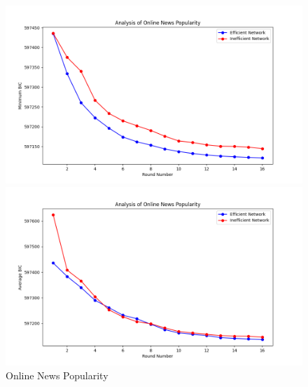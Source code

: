 \documentclass[conference]{IEEEtran}
\begin{document}
\begin{figure}[htbp]
\centerline{\includegraphics[scale=0.4]{figures/Online News Popularity Min.png}}
\centerline{\includegraphics[scale=0.4]{figures/Online News Popularity Avg.png}}
\caption{Online News Popularity}
\label{fig}
\end{figure}
\end{document}
